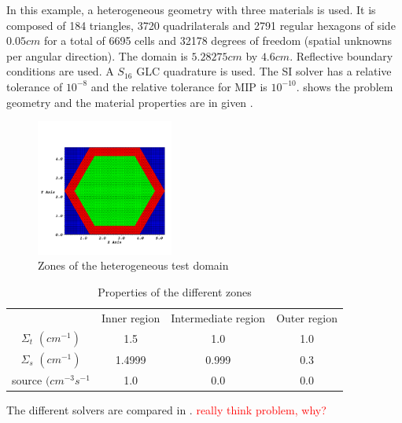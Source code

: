 In this example, a heterogeneous geometry with three materials is used. It is 
composed of 184 triangles, 3720 quadrilaterals and 2791 regular hexagons of 
side $0.05cm$ for a total of 6695 cells and 32178 degrees of freedom (spatial 
unknowns per angular direction). The domain is $5.28275cm$ by $4.6cm$. 
Reflective boundary conditions are used. A $S_{16}$ GLC 
quadrature is used. The SI solver has a relative tolerance of 
$10^{-8}$ and the relative tolerance for MIP is $10^{-10}$. 
shows the problem geometry and the material properties are in given
.
\begin{figure}[H]
  \centering
  \includegraphics[width=0.4\textwidth]{source_crop}
  \caption{Zones of the heterogeneous test domain}
  \label{hex_zones}
\end{figure}
\begin{table}[H]
  \begin{center}
    \caption{Properties of the different zones}
    \begin{tabular}{|c|c|c|c|}
      \hline
       & Inner region & Intermediate region & Outer region \\
      $\Sigma_t$ $(cm^{-1})$ & 1.5 & 1.0 & 1.0 \\
      $\Sigma_s$ $(cm^{-1})$ & 1.4999 & 0.999 & 0.3 \\
     source $(cm^{-3}s^{-1}$ & 1.0 & 0.0 & 0.0 \\
      \hline
    \end{tabular}
    \label{hex_prop}
  \end{center}
\end{table}
The different solvers are compared in .
\textcolor{red}{really think problem, why?}
